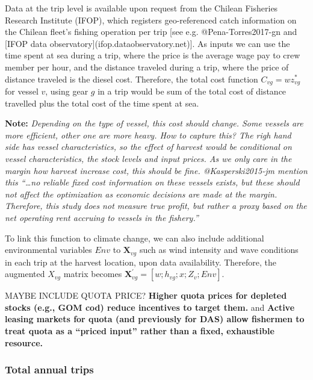 Data at the trip level is available upon request from the Chilean
Fisheries Research Institute (IFOP), which registers geo-referenced
catch information on the Chilean fleet's fishing operation per trip
{[}see e.g. @Pena-Torres2017-gn and {[}IFOP data
observatory{]}(ifop.dataobservatory.net){]}. As inputs we can use the
time spent at sea during a trip, where the price is the average wage pay
to crew member per hour, and the distance traveled during a trip, where
the price of distance traveled is the diesel cost. Therefore, the total
cost function \(C_{vg}= w z_{vg}^*\) for vessel \(v\), using gear \(g\)
in a trip would be sum of the total cost of distance travelled plus the
total cost of the time spent at sea.

\textbf{Note:} \emph{Depending on the type of vessel, this cost should
change. Some vessels are more efficient, other one are more heavy. How
to capture this? The righ hand side has vessel characteristics, so the
effect of harvest would be conditional on vessel characteristics, the
stock levels and input prices. As we only care in the margin how harvest
increase cost, this should be fine. @Kasperski2015-jm mention this
``\ldots no reliable fixed cost information on these vessels exists, but
these should not affect the optimization as economic decisions are made
at the margin. Therefore, this study does not measure true profit, but
rather a proxy based on the net operating rent accruing to vessels in
the fishery.''}

To link this function to climate change, we can also include additional
environmental variables \(Env\) to \(\mathbf{X}_{vg}\) such as wind
intensity and wave conditions in each trip at the harvest location, upon
data availability. Therefore, the augmented \(X_{vg}\) matrix becomes
\(\mathbf{X}^{'}_{vg} = [w;h_{vg};x;Z_v;Env]\).

MAYBE INCLUDE QUOTA PRICE? \textbf{Higher quota prices for depleted
stocks (e.g., GOM cod) reduce incentives to target them.} and
\textbf{Active leasing markets for quota (and previously for DAS) allow
fishermen to treat quota as a ``priced input'' rather than a fixed,
exhaustible resource.}

\hypertarget{total-annual-trips}{%
\subsubsection{Total annual trips}\label{total-annual-trips}}


